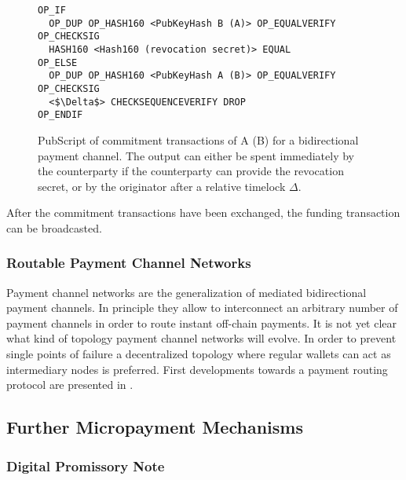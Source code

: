 \begin{figure}
\begin{lstlisting}[breaklines,mathescape=true]
OP_IF
  OP_DUP OP_HASH160 <PubKeyHash B (A)> OP_EQUALVERIFY OP_CHECKSIG
  HASH160 <Hash160 (revocation secret)> EQUAL
OP_ELSE
  OP_DUP OP_HASH160 <PubKeyHash A (B)> OP_EQUALVERIFY OP_CHECKSIG
  <$\Delta$> CHECKSEQUENCEVERIFY DROP
OP_ENDIF
\end{lstlisting} 
\caption{PubScript of commitment transactions of A (B) for a bidirectional payment channel. The output can either be spent immediately by the counterparty if the counterparty can provide the revocation secret, or by the originator after a relative timelock $\Delta$.}
\label{fig:pubScriptCommitment}
\end{figure}

After the commitment transactions have been exchanged, the funding transaction can be broadcasted. 

\subsubsection{Routable Payment Channel Networks}
\label{sec:paymentchannelnetworks}

Payment channel networks are the generalization of mediated bidirectional payment channels. In principle they allow to interconnect an arbitrary number of payment channels in order to route instant off-chain payments. It is not yet clear what kind of topology payment channel networks will evolve. In order to prevent single points of failure a decentralized topology where regular wallets can act as intermediary nodes is preferred. First developments towards a payment routing protocol are presented in \parencite{BitFuryFlare2016}.

\subsection{Further Micropayment Mechanisms}

\subsubsection{Digital Promissory Note}


